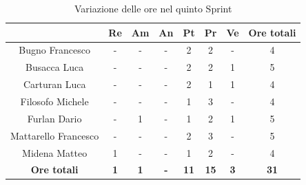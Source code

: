 \begin{table}[H]
  \centering
  \renewcommand{\arraystretch}{1.8}
  \begin{tabular}{c|c|c|c|c|c|c|c}
    \rowcolor[HTML]{125E28}
    \multicolumn{1}{c}{\color[HTML]{FFFFFF}\textbf{ Nominativo }}
                         & \multicolumn{1}{c}{\color[HTML]{FFFFFF}\textbf{ Re }}
                         & \multicolumn{1}{c}{\color[HTML]{FFFFFF}\textbf{ Am}}
                         & \multicolumn{1}{c}{\color[HTML]{FFFFFF}\textbf{ An }}
                         & \multicolumn{1}{c}{\color[HTML]{FFFFFF}\textbf{ Pt }}
                         & \multicolumn{1}{c}{\color[HTML]{FFFFFF}\textbf{ Pr }}
                         & \multicolumn{1}{c}{\color[HTML]{FFFFFF}\textbf{ Ve }}
                         & \multicolumn{1}{c}{\color[HTML]{FFFFFF}\textbf{ Ore totali }}                                                                                  \\
    \hline
    Bugno Francesco      & -                                                             & -          & -          & 2           & 2           & -          & 4           \\
    Busacca Luca         & -                                                             & -          & -          & 2           & 2           & 1          & 5           \\
    Carturan Luca        & -                                                             & -          & -          & 2           & 1           & 1          & 4           \\
    Filosofo Michele     & -                                                             & -          & -          & 1           & 3           & -          & 4           \\
    Furlan Dario         & -                                                             & 1          & -          & 1           & 2           & 1          & 5           \\
    Mattarello Francesco & -                                                             & -          & -          & 2           & 3           & -          & 5           \\
    Midena Matteo        & 1                                                             & -          & -          & 1           & 2           & -          & 4           \\
    \textbf{Ore totali}  & \textbf{1}                                                    & \textbf{1} & \textbf{-} & \textbf{11} & \textbf{15} & \textbf{3} & \textbf{31}
  \end{tabular}
  \caption{Variazione delle ore nel quinto Sprint}
\end{table}

